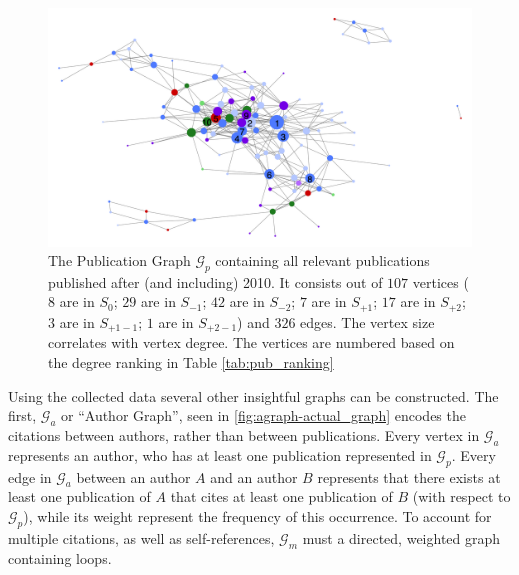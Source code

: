 \documentclass[11pt,a4paper]{book}
\theoremstyle{definition}
\theoremstyle{definition}
\theoremstyle{definition}
\theoremstyle{remark}
\newcommand{\psetz}{S_{\mathit{0}}}
\newcommand{\psetb}{S_{\mathit{-1}}}
\newcommand{\psetbb}{S_{\mathit{-2}}}
\newcommand{\psetf}{S_{\mathit{+1}}}
\newcommand{\psetff}{S_{\mathit{+2}}}
\newcommand{\psetfb}{S_{\mathit{+1-1}}}
\newcommand{\psetffb}{S_{\mathit{+2-1}}}
\newcommand{\pgraph}{\mathcal{G}_{p}}
\newcommand{\agraph}{\mathcal{G}_{a}}
\newcommand{\acgraph}{\mathcal{G}_{m}}
\begin{document}
\begin{figure}[h!]
\includegraphics[width=\textwidth]{actual_graph.png}
\caption{The Publication Graph  $\pgraph$ containing all relevant publications published after (and including) 2010. It consists out of $107$ vertices ($8$ are in \textcolor{cstepz}{$\psetz$}; $29$ are in \textcolor{cstepb}{$\psetb$};
$42$ are in \textcolor{cstepbb}{$\psetbb$}; $7$ are in \textcolor{cstepf}{$\psetf$}; $17$ are in \textcolor{cstepff}{$\psetff$}; $3$ are in \textcolor{cstepfb}{$\psetfb$}; $1$ are in \textcolor{cstepffb}{$\psetffb$}) and $326$ edges.
The vertex size correlates with vertex degree. The vertices are numbered based on the degree ranking in Table \ref{tab:pub_ranking}}
\label{fig:pgraph-actual_graph}
\end{figure}




Using the collected data several other insightful graphs can be constructed. The first, $\agraph$  or ``Author Graph'', seen in \ref{fig:agraph-actual_graph} encodes the citations between authors, rather than between publications. Every vertex in $\agraph$ represents an author, who has at least one publication represented in $\pgraph$. Every edge in $\agraph$ between an author $A$ and an author $B$ represents that there exists at least one publication of $A$ that cites at least one publication of $B$ (with respect to $\pgraph$), while its weight represent the frequency of this occurrence. To account for multiple citations, as well as self-references, $\acgraph$ must a directed, weighted graph containing loops.
\end{document}
